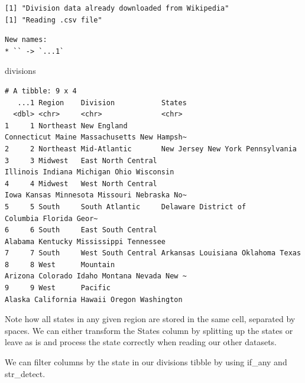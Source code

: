 \documentclass[
  letterpaper,
  DIV=11,
  numbers=noendperiod]{scrartcl}
\newenvironment{Shaded}{\begin{snugshade}}{\end{snugshade}}
\newcommand{\NormalTok}[1]{\textcolor[rgb]{0.00,0.23,0.31}{#1}}
\begin{document}
\begin{verbatim}
[1] "Division data already downloaded from Wikipedia"
[1] "Reading .csv file"
\end{verbatim}

\begin{verbatim}
New names:
* `` -> `...1`
\end{verbatim}

\begin{Shaded}
\begin{Highlighting}[]
\NormalTok{divisions}
\end{Highlighting}
\end{Shaded}

\begin{verbatim}
# A tibble: 9 x 4
   ...1 Region    Division           States                                     
  <dbl> <chr>     <chr>              <chr>                                      
1     1 Northeast New England        Connecticut Maine Massachusetts New Hampsh~
2     2 Northeast Mid-Atlantic       New Jersey New York Pennsylvania           
3     3 Midwest   East North Central Illinois Indiana Michigan Ohio Wisconsin   
4     4 Midwest   West North Central Iowa Kansas Minnesota Missouri Nebraska No~
5     5 South     South Atlantic     Delaware District of Columbia Florida Geor~
6     6 South     East South Central Alabama Kentucky Mississippi Tennessee     
7     7 South     West South Central Arkansas Louisiana Oklahoma Texas          
8     8 West      Mountain           Arizona Colorado Idaho Montana Nevada New ~
9     9 West      Pacific            Alaska California Hawaii Oregon Washington 
\end{verbatim}

Note how all states in any given region are stored in the same cell,
separated by spaces. We can either transform the States column by
splitting up the states or leave as is and process the state correctly
when reading our other datasets.

We can filter columns by the state in our divisions tibble by using
if\_any and str\_detect.
\end{document}
